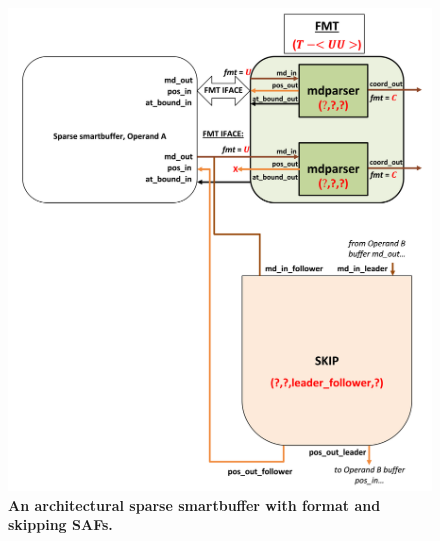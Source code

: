 \begin{figure}[ht]
\includegraphics[width=\textwidth]{figures/safinference_build_03fmttopology.png}
\caption{\textbf{An architectural sparse smartbuffer with format and skipping SAFs.}}
\label{fig:safinference_build_03fmttopology}
\centering
\end{figure}



